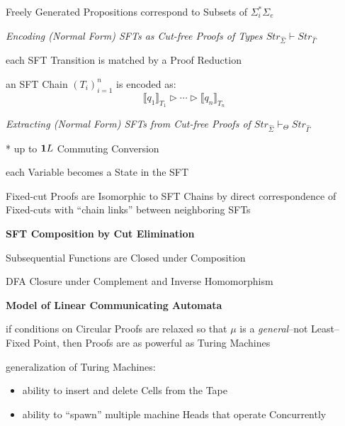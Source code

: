 Freely Generated Propositions correspond to Subsets of
$\Sigma_i^*\Sigma_e$


\emph{Encoding (Normal Form) SFTs as Cut-free Proofs of Types
  $Str_{\hat{\Sigma}} \vdash Str_{\hat{\Gamma}}$} %

each SFT Transition is matched by a Proof Reduction

an SFT Chain $(T_i)^n_{i=1}$ is encoded as:
\[
  \llbracket{q_1}\rrbracket_{T_1} \rhd \cdots \rhd
  \llbracket{q_n}\rrbracket_{T_n}
\]


\emph{Extracting (Normal Form) SFTs from Cut-free Proofs of
  $Str_{\hat{\Sigma}} \vdash_\Theta Str_{\hat{\Gamma}}$}

* up to $\mathbf{1}{L}$ Commuting Conversion

each Variable becomes a State in the SFT

Fixed-cut Proofs are Isomorphic to SFT Chains by direct correspondence
of Fixed-cuts with ``chain links'' between neighboring SFTs


\textbf{SFT Composition by Cut Elimination}

Subsequential Functions are Closed under Composition

DFA Closure under Complement and Inverse Homomorphism


\textbf{Model of Linear Communicating Automata}

if conditions on Circular Proofs are relaxed so that $\mu$ is a
\emph{general}--not Least--Fixed Point, then Proofs are as powerful as
Turing Machines

generalization of Turing Machines:
\begin{itemize}
  \item ability to insert and delete Cells from the Tape
  \item ability to ``spawn'' multiple machine Heads that operate
    Concurrently
\end{itemize}


